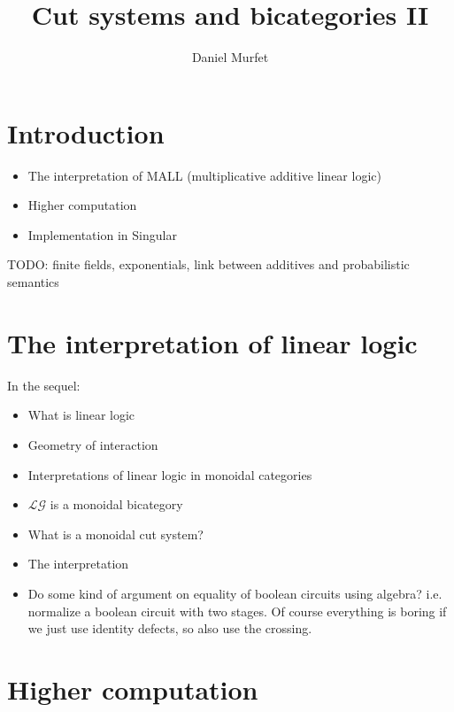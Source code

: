 \documentclass[english,letter paper,12pt,leqno]{article}
\theoremstyle{example}
\numberwithin{equation}{section}
\def\res{\operatorname{Res}}
\def\LG{\mathcal{LG}}
\begin{document}
\def\Res{\res\!}
\newcommand{\cat}[1]{\mathcal{#1}}
\newcommand{\lto}{\longrightarrow}
\newcommand{\xlto}[1]{\stackrel{#1}\lto}
\newcommand{\mf}[1]{\mathfrak{#1}}
\newcommand{\md}[1]{\mathscr{#1}}
\def\l{\,|\,}
\def\sgn{\textup{sgn}}

\title{Cut systems and bicategories II}
\author{Daniel Murfet}

\maketitle

\section{Introduction}

\begin{itemize}
\item The interpretation of MALL (multiplicative additive linear logic)
\item Higher computation
\item Implementation in Singular
\end{itemize}

TODO: finite fields, exponentials, link between additives and probabilistic semantics

\section{The interpretation of linear logic}

In the sequel:

\begin{itemize}
\item What is linear logic
\item Geometry of interaction
\item Interpretations of linear logic in monoidal categories
\item $\LG$ is a monoidal bicategory
\item What is a monoidal cut system?
\item The interpretation
\item Do some kind of argument on equality of boolean circuits using algebra? i.e. normalize a boolean circuit with two stages. Of course everything is boring if we just use identity defects, so also use the crossing.
\end{itemize}

\section{Higher computation}
\end{document}
